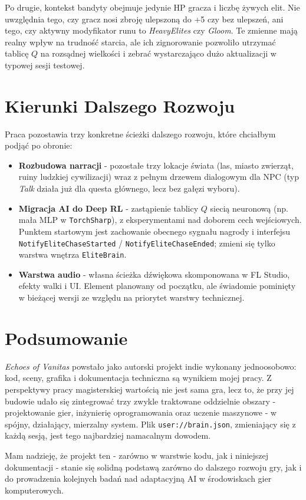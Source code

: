 Po drugie, kontekst bandyty obejmuje jedynie HP gracza i liczbę żywych elit. Nie uwzględnia tego, czy gracz nosi zbroję ulepszoną do +5 czy bez ulepszeń, ani tego, czy aktywny modyfikator runu to \textit{HeavyElites} czy \textit{Gloom}. Te zmienne mają realny wpływ na trudność starcia, ale ich zignorowanie pozwoliło utrzymać tablicę $Q$ na rozsądnej wielkości i zebrać wystarczająco dużo aktualizacji w typowej sesji testowej.

\section{Kierunki Dalszego Rozwoju}

Praca pozostawia trzy konkretne ścieżki dalszego rozwoju, które chciałbym podjąć po obronie:

\begin{itemize}
    \item \textbf{Rozbudowa narracji} - pozostałe trzy lokacje świata (las, miasto zwierząt, ruiny ludzkiej cywilizacji) wraz z pełnym drzewem dialogowym dla NPC (typ \textit{Talk} działa już dla questa głównego, lecz bez gałęzi wyboru).
    \item \textbf{Migracja AI do Deep RL} - zastąpienie tablicy $Q$ siecią neuronową (np. mała MLP w \texttt{TorchSharp}), z eksperymentami nad doborem cech wejściowych. Punktem startowym jest zachowanie obecnego sygnału nagrody i interfejsu \texttt{NotifyEliteChaseStarted} / \texttt{NotifyEliteChaseEnded}; zmieni się tylko warstwa wnętrza \texttt{EliteBrain}.
    \item \textbf{Warstwa audio} - własna ścieżka dźwiękowa skomponowana w FL Studio, efekty walki i UI. Element planowany od początku, ale świadomie pominięty w bieżącej wersji ze względu na priorytet warstwy technicznej.
\end{itemize}

\section{Podsumowanie}

\textit{Echoes of Vanitas} powstało jako autorski projekt indie wykonany jednoosobowo: kod, sceny, grafika i dokumentacja techniczna są wynikiem mojej pracy. Z perspektywy pracy magisterskiej wartością nie jest sama gra, lecz to, że przy jej budowie udało się zintegrować trzy zwykle traktowane oddzielnie obszary - projektowanie gier, inżynierię oprogramowania oraz uczenie maszynowe - w spójny, działający, mierzalny system. Plik \texttt{user://brain.json}, zmieniający się z każdą sesją, jest tego najbardziej namacalnym dowodem.

Mam nadzieję, że projekt ten - zarówno w warstwie kodu, jak i niniejszej dokumentacji - stanie się solidną podstawą zarówno do dalszego rozwoju gry, jak i do prowadzenia kolejnych badań nad adaptacyjną AI w środowiskach gier komputerowych.
